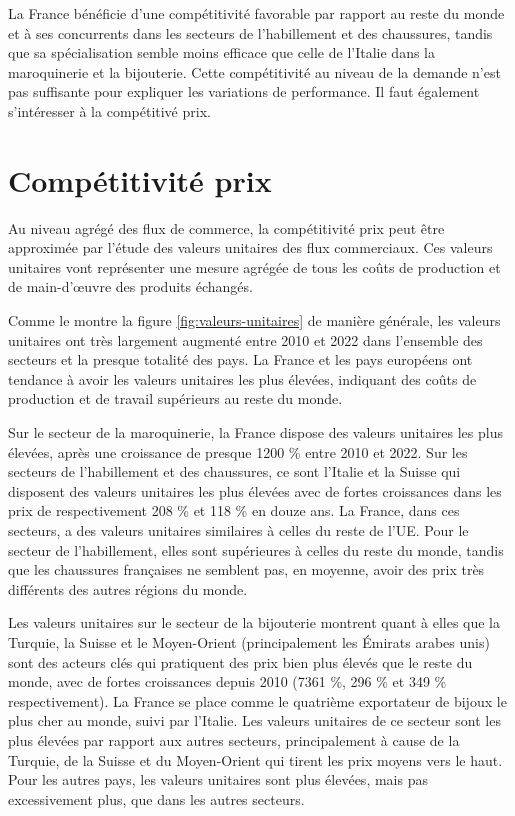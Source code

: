 \documentclass[french,10pt,a4paper]{article}
\begin{document}
La France bénéficie d'une compétitivité favorable par rapport au reste du monde et à ses concurrents dans les secteurs de l'habillement et des chaussures, tandis que sa spécialisation semble moins efficace que celle de l'Italie dans la maroquinerie et la bijouterie. Cette compétitivité au niveau de la demande n'est pas suffisante pour expliquer les variations de performance. Il faut également s'intéresser à la compétitivé prix.

\section{Compétitivité prix}
Au niveau agrégé des flux de commerce, la compétitivité prix peut être approximée par l'étude des valeurs unitaires des flux commerciaux. Ces valeurs unitaires vont représenter une mesure agrégée de tous les coûts de production et de main-d'œuvre des produits échangés.

Comme le montre la figure \ref{fig:valeurs-unitaires} de manière générale, les valeurs unitaires ont très largement augmenté entre 2010 et 2022 dans l'ensemble des secteurs et la presque totalité des pays. La France et les pays européens ont tendance à avoir les valeurs unitaires les plus élevées, indiquant des coûts de production et de travail supérieurs au reste du monde.

Sur le secteur de la maroquinerie, la France dispose des valeurs unitaires les plus élevées, après une croissance de presque 1200 \% entre 2010 et 2022. Sur les secteurs de l'habillement et des chaussures, ce sont l'Italie et la Suisse qui disposent des valeurs unitaires les plus élevées avec de fortes croissances dans les prix de respectivement 208 \% et 118 \% en douze ans. La France, dans ces secteurs, a des valeurs unitaires similaires à celles du reste de l'UE. Pour le secteur de l'habillement, elles sont supérieures à celles du reste du monde, tandis que les chaussures françaises ne semblent pas, en moyenne, avoir des prix très différents des autres régions du monde. 

Les valeurs unitaires sur le secteur de la bijouterie montrent quant à elles que la Turquie, la Suisse et le Moyen-Orient (principalement les Émirats arabes unis) sont des acteurs clés qui pratiquent des prix bien plus élevés que le reste du monde, avec de fortes croissances depuis 2010 (7361 \%, 296 \% et 349 \% respectivement). La France se place comme le quatrième exportateur de bijoux le plus cher au monde, suivi par l'Italie. Les valeurs unitaires de ce secteur sont les plus élevées par rapport aux autres secteurs, principalement à cause de la Turquie, de la Suisse et du Moyen-Orient qui tirent les prix moyens vers le haut. Pour les autres pays, les valeurs unitaires sont plus élevées, mais pas excessivement plus, que dans les autres secteurs. 
\end{document}
